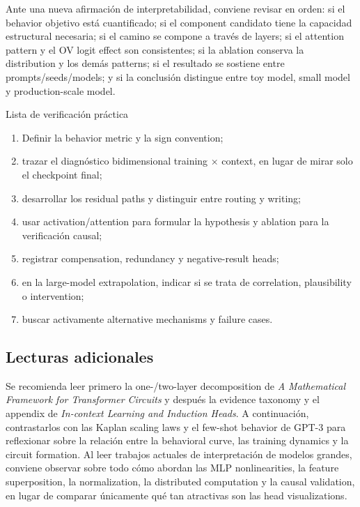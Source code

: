 Ante una nueva afirmación de interpretabilidad, conviene revisar en orden: si el behavior objetivo está cuantificado; si el component candidato tiene la capacidad estructural necesaria; si el camino se compone a través de layers; si el attention pattern y el OV logit effect son consistentes; si la ablation conserva la distribution y los demás patterns; si el resultado se sostiene entre prompts/seeds/models; y si la conclusión distingue entre toy model, small model y production-scale model.

\begin{knowledgebox}{Lista de verificación práctica}
\begin{enumerate}
  \item Definir la behavior metric y la sign convention;
  \item trazar el diagnóstico bidimensional training × context, en lugar de mirar solo el checkpoint final;
  \item desarrollar los residual paths y distinguir entre routing y writing;
  \item usar activation/attention para formular la hypothesis y ablation para la verificación causal;
  \item registrar compensation, redundancy y negative-result heads;
  \item en la large-model extrapolation, indicar si se trata de correlation, plausibility o intervention;
  \item buscar activamente alternative mechanisms y failure cases.
\end{enumerate}
\end{knowledgebox}

\subsection{Lecturas adicionales}

Se recomienda leer primero la one-/two-layer decomposition de \emph{A Mathematical Framework for Transformer Circuits} y después la evidence taxonomy y el appendix de \emph{In-context Learning and Induction Heads}. A continuación, contrastarlos con las Kaplan scaling laws y el few-shot behavior de GPT-3 para reflexionar sobre la relación entre la behavioral curve, las training dynamics y la circuit formation. Al leer trabajos actuales de interpretación de modelos grandes, conviene observar sobre todo cómo abordan las MLP nonlinearities, la feature superposition, la normalization, la distributed computation y la causal validation, en lugar de comparar únicamente qué tan atractivas son las head visualizations.



